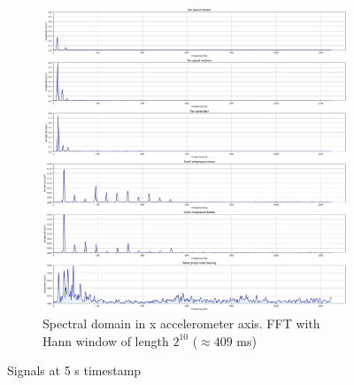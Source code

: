 \begin{figure}[ht]
\begin{subfigure}[b]{0.55\textwidth}
        \includegraphics[width=\textwidth]{assets/design/EDA-custom-dataset-spectral-X-axis.png}
        \caption{Spectral domain in x accelerometer axis. FFT with Hann window of length $2^{10}$ ($\approx 409$ ms)}
    \end{subfigure} 
    \caption{Signals at 5 s timestamp}
\end{figure}






\newpage
